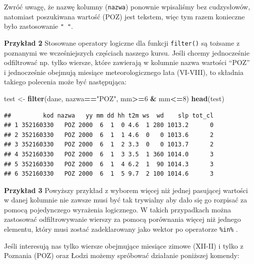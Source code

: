 \documentclass[]{book}
\newenvironment{Shaded}{\begin{snugshade}}{\end{snugshade}}
\newcommand{\KeywordTok}[1]{\textcolor[rgb]{0.13,0.29,0.53}{\textbf{#1}}}
\newcommand{\DecValTok}[1]{\textcolor[rgb]{0.00,0.00,0.81}{#1}}
\newcommand{\StringTok}[1]{\textcolor[rgb]{0.31,0.60,0.02}{#1}}
\newcommand{\OperatorTok}[1]{\textcolor[rgb]{0.81,0.36,0.00}{\textbf{#1}}}
\newcommand{\NormalTok}[1]{#1}
\theoremstyle{definition}
\theoremstyle{definition}
\theoremstyle{definition}
\theoremstyle{remark}
\begin{document}
Zwróć uwagę, że nazwę kolumny (\texttt{nazwa}) ponownie wpisaliśmy bez
cudzysłowów, natomiast poszukiwana wartość (POZ) jest tekstem, więc tym
razem konieczne było zastosowanie \texttt{"\ "}.

\textbf{Przykład 2} Stosowane operatory logiczne dla funkcji
\texttt{filter()} są tożsame z poznanymi we wcześniejszych częściach
naszego kursu. Jeśli chcemy jednocześnie odfiltrować np. tylko wiersze,
które zawierają w kolumnie nazwa wartości ``POZ'' i jednocześnie
obejmują miesiące meteorologicznego lata (VI-VIII), to składnia takiego
polecenia może być następująca:

\begin{Shaded}
\begin{Highlighting}[]
\NormalTok{test <-}\StringTok{ }\KeywordTok{filter}\NormalTok{(dane, nazwa}\OperatorTok{==}\StringTok{"POZ"}\NormalTok{, mm}\OperatorTok{>=}\DecValTok{6} \OperatorTok{&}\StringTok{ }\NormalTok{mm}\OperatorTok{<=}\DecValTok{8}\NormalTok{)}
\KeywordTok{head}\NormalTok{(test)}
\end{Highlighting}
\end{Shaded}

\begin{verbatim}
##         kod nazwa   yy mm dd hh t2m ws  wd    slp tot_cl
## 1 352160330   POZ 2000  6  1  0 4.6  1 280 1013.2      0
## 2 352160330   POZ 2000  6  1  1 4.6  0   0 1013.6      2
## 3 352160330   POZ 2000  6  1  2 3.3  0   0 1013.7      2
## 4 352160330   POZ 2000  6  1  3 3.5  1 360 1014.0      3
## 5 352160330   POZ 2000  6  1  4 6.2  1  90 1014.3      3
## 6 352160330   POZ 2000  6  1  5 9.7  2 100 1014.6      3
\end{verbatim}

\textbf{Przykład 3} Powyższy przykład z wyborem więcej niż jednej
pasującej wartości w danej kolumnie nie zawsze musi być tak trywialny
aby dało się go rozpisać za pomocą pojedynczego wyrażenia logicznego. W
takich przypadkach można zastosować odfiltrowywanie wierszy za pomocą
porównania więcej niż jednego elementu, który musi zostać zadeklarowany
jako wektor po operatorze \texttt{\%in\%} .

Jeśli interesują nas tylko wiersze obejmujące miesiące zimowe (XII-II) i
tylko z Poznania (POZ) oraz Łodzi możemy spróbować działanie poniższej
komendy:

\begin{Shaded}
\end{Shaded}
\end{document}
